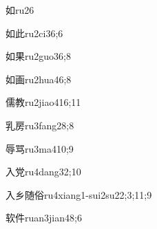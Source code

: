 \begin{verbete}{如}{ru2}{6}
\end{verbete}

\begin{verbete}{如此}{ru2ci3}{6;6}
\end{verbete}

\begin{verbete}{如果}{ru2guo3}{6;8}
\end{verbete}

\begin{verbete}{如画}{ru2hua4}{6;8}
\end{verbete}

\begin{verbete}{儒教}{ru2jiao4}{16;11}
\end{verbete}

\begin{verbete}{乳房}{ru3fang2}{8;8}
\end{verbete}

\begin{verbete}{辱骂}{ru3ma4}{10;9}
\end{verbete}

\begin{verbete}{入党}{ru4dang3}{2;10}
\end{verbete}

\begin{verbete}{入乡随俗}{ru4xiang1-sui2su2}{2;3;11;9}
\end{verbete}

\begin{verbete}{软件}{ruan3jian4}{8;6}
\end{verbete}

